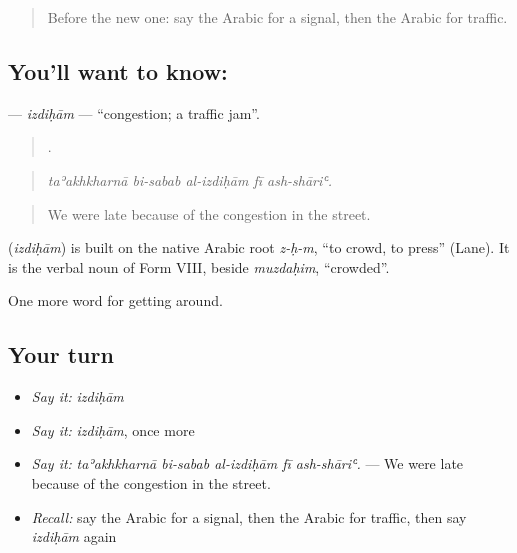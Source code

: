 \begin{quote}
Before the new one: say the Arabic for a signal, then the Arabic for traffic.
\end{quote}

\subsection*{You'll want to know: }
\textbf{} — \emph{izdiḥām} — \textquotedblleft{}congestion; a traffic jam\textquotedblright{}.

\begin{quote}
    .
\end{quote}

\begin{quote}
\emph{taʾakhkharnā bi-sabab al-izdiḥām fī ash-shāriʿ.}
\end{quote}

\begin{quote}
We were late because of the congestion in the street.
\end{quote}

\begin{cousinweb}
\textbf{} (\emph{izdiḥām}) is built on the native Arabic root \emph{z-ḥ-m}, \textquotedblleft{}to crowd, to press\textquotedblright{} (Lane). It is the verbal noun of Form VIII, beside \emph{muzdaḥim}, \textquotedblleft{}crowded\textquotedblright{}.
\end{cousinweb}

\begin{grammarlens}[title={What you've built}]
One more word for getting around.
\end{grammarlens}

\subsection*{Your turn}
\begin{itemize}
\raggedright
  \item \emph{Say it:} \emph{izdiḥām}
  \item \emph{Say it:} \emph{izdiḥām}, once more
  \item \emph{Say it:} \emph{taʾakhkharnā bi-sabab al-izdiḥām fī ash-shāriʿ.} — We were late because of the congestion in the street.
  \item \emph{Recall:} say the Arabic for a signal, then the Arabic for traffic, then say \emph{izdiḥām} again
\end{itemize}

